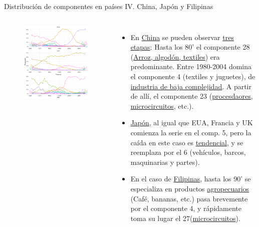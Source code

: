 \documentclass[compress]{beamer}
\begin{document}
\begin{frame}
\small
Distribución de componentes en países IV. China, Japón y Filipinas
\scriptsize
\begin{columns}[c] 
	
	\begin{figure}
		\includegraphics[width=\linewidth]{graficoLDA_k30_CHN_JPN_PHL}
	\end{figure}
	
	
	\begin{itemize}[label=\faRebel]
		\item En \underline{China} se pueden observar \underline{tres etapas}: Hasta los 80' el componente 28 (\underline{Arroz, algodón, textiles}) era predominante. Entre 1980-2004 domina el componente 4 (textiles y juguetes), de \underline{industria de baja complejidad}. A partir de allí, el componente 23 (\underline{procesdaores, microcircuitos}, etc.). 
		\item\underline{ Japón}, al igual que EUA, Francia y UK comienza la serie en el comp. 5, pero la caída en este caso es \underline{tendencial}, y se reemplaza por el 6 (vehículos, barcos, maquinarias y partes). 
		\item En el caso de \underline{Filipinas}, hasta los 90' se especializa en productos \underline{agropecuarios} (Café, bananas, etc.) pasa brevemente por el componente 4, y rápidamente toma su lugar el 27(\underline{microcircuitos}).
	\end{itemize}
	

\end{columns}
\end{frame}
\end{document}
